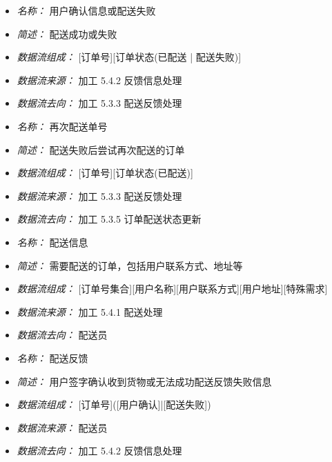 \vspace{-1mm}


\begin{itemize}
\item \textit{名称： }用户确认信息或配送失败
\item \textit{简述： }配送成功或失败 
\item \textit{数据流组成： }[订单号][订单状态(已配送 | 配送失败)] 
\item \textit{数据流来源： }加工 5.4.2 反馈信息处理 
\item \textit{数据流去向： }加工 5.3.3 配送反馈处理

\end{itemize}


\vspace{-1mm}


\begin{itemize}
\item \textit{名称： }再次配送单号 
\item \textit{简述： }配送失败后尝试再次配送的订单 
\item \textit{数据流组成： }[订单号][订单状态(已配送)] 
\item \textit{数据流来源： }加工 5.3.3 配送反馈处理 
\item \textit{数据流去向： }加工 5.3.5 订单配送状态更新

\end{itemize}


\vspace{-1mm}


\begin{itemize}
\item \textit{名称： }配送信息
\item \textit{简述： }需要配送的订单，包括用户联系方式、地址等 
\item \textit{数据流组成： }[订单号集合][用户名称][用户联系方式][用户地址][特殊需求] 
\item \textit{数据流来源： }加工 5.4.1 配送处理
\item \textit{数据流去向： }配送员

\end{itemize}


\vspace{-1mm}


\begin{itemize}
\item \textit{名称： }配送反馈 
\item \textit{简述： }用户签字确认收到货物或无法成功配送反馈失败信息 
\item \textit{数据流组成： }[订单号]([用户确认]|[配送失败]) 
\item \textit{数据流来源： }配送员
\item \textit{数据流去向： }加工 5.4.2 反馈信息处理

\end{itemize}


